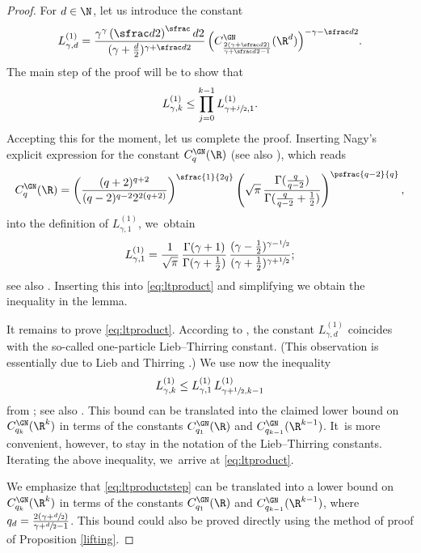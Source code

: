 \begin{proof}
For $d\in\N$, let us introduce the constant
\[
L_{\gamma,d}^{(1)} = \frac{\gamma^\gamma \left(\sfrac d2\right)^\sfrac d2}{(\gamma+\frac d2)^{\gamma+\sfrac d2}} \,\Bigl(C_\frac{2(\gamma+\sfrac d2)}{\gamma+\sfrac d2-1}^\GN(\R^d)\Bigr)^{-\gamma-\sfrac d2}.
\]
The main step of the proof will be to show that
\begin{equation}
\label{eq:ltproduct}
L_{\gamma,k}^{(1)} \leq \prod_{j=0}^{k-1} L_{\gamma+\sfrac j2,1}^{(1)}.
\end{equation}
Accepting this for the moment, let us complete the proof. Inserting Nagy's explicit expression for the constant $C_q^\GN(\R)$ \cite{Na} (see also \cite[Th.\,2.48]{FLW}), which reads
\begin{equation}\label{eq:Nag}
C_{q}^\GN(\R) = \left(\frac{(q+2)^{q+2}}{(q-2)^{q-2}2^{2(q+2)}}\right)^\sfrac{1}{2q} \left(\sqrt\pi \,\frac{\Gamma(\frac{q}{q-2})}{\Gamma(\frac{q}{q-2}+\frac12)}\right)^\psfrac{q-2}{q},
\end{equation}
into the definition of $L_{\gamma,1}^{(1)}$, we~obtain
\[
L_{\gamma,1}^{(1)} = \frac{1}{\sqrt\pi}\,\frac{\Gamma(\gamma+1)}{\Gamma(\gamma+\frac12)}\,\frac{(\gamma-\frac12)^{\gamma-\sfrac12}}{(\gamma+\frac12)^{\gamma+\sfrac12}};
\]
see also \cite[Cor.\,5.4]{FLW}. Inserting this into \eqref{eq:ltproduct} and simplifying we obtain the inequality in the lemma.

It remains to prove \eqref{eq:ltproduct}. According to \cite[Prop.\,5.3]{FLW}, the constant $L_{\gamma,d}^{(1)}$ coincides with the so-called one-particle Lieb--Thirring constant. (This observation is essentially due to Lieb and Thirring \cite{LiTh}.) We use now the inequality
\begin{equation}
\label{eq:ltproductstep}
L_{\gamma,k}^{(1)} \leq L_{\gamma,1}^{(1)} \,L_{\gamma+\sfrac12,k-1}^{(1)}
\end{equation}
from \cite{FGL}; see also \cite[Prop.\,5.14]{FLW}. This bound can be translated into the claimed lower bound on $C_{q_k}^\GN(\R^k)$ in terms of the constants $C_{q_1}^\GN(\R)$ and $C_{q_{k-1}}^\GN(\R^{k-1})$. It~is more convenient, however, to stay in the notation of the Lieb--Thirring constants. Iterating the above inequality, we~arrive at \eqref{eq:ltproduct}.

We emphasize that \eqref{eq:ltproductstep} can be translated into a lower bound on $C_{q_k}^\GN(\R^k)$ in terms of the constants $C_{q_1}^\GN(\R)$ and $C_{q_{k-1}}^\GN(\R^{k-1})$, where $q_d=\frac{2(\gamma+\sfrac d2)}{\gamma+\sfrac d2-1}$. This bound could also be proved directly using the method of proof of Proposition \ref{lifting}.
\end{proof}

